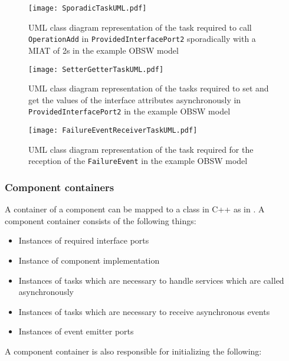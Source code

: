\begin{figure}[h]
	\centering
	\texttt{[image: SporadicTaskUML.pdf]}
	\caption{UML class diagram representation of the task required to call \texttt{OperationAdd} in \texttt{Provided\allowbreak Interface\allowbreak Port2} sporadically with a MIAT of 2s in the example OBSW model}
	\label{fig: Sporadic task UML}
\end{figure}

\begin{figure}[h]
	\centering
	\texttt{[image: SetterGetterTaskUML.pdf]}
	\caption{UML class diagram representation of the tasks required to set and get the values of the interface attributes asynchronously in \texttt{Provided\allowbreak Interface\allowbreak Port2} in the example OBSW model}
	\label{fig: Status value getter setter task UML}
\end{figure}

\begin{figure}[h]
	\centering
	\texttt{[image: FailureEventReceiverTaskUML.pdf]}
	\caption{UML class diagram representation of the task required for the reception of the \texttt{Failure\allowbreak Event} in the example OBSW model}
	\label{fig: Event receiver task UML}
\end{figure}

\subsubsection{\textbf{Component containers}}
A container of a component can be mapped to a class in C++ as in \cite{EvoRAVCodeAr}. A component container consists of the following things:

\begin{itemize}
\item Instances of required interface ports
\item Instance of component implementation 
\item Instances of tasks which are necessary to handle services which are called asynchronously 
\item Instances of tasks which are necessary to receive asynchronous events
\item Instances of event emitter ports
\end{itemize}

A component container is also responsible for initializing the following:

